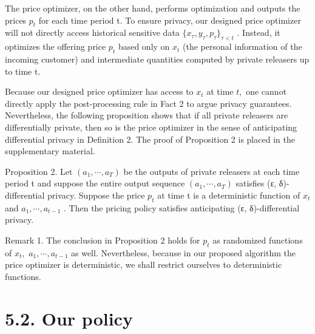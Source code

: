 The price optimizer, on the other hand, performs optimization and outputs the prices \(p _ { t }\) for each time period t. To ensure privacy, our designed price optimizer will not directly access historical sensitive data \(\{ x _ { \tau } , y _ { \tau } , p _ { \tau } \} _ { \tau < t }\) . Instead, it optimizes the offering price \(p _ { t }\) based only on \(x _ { t }\) (the personal information of the incoming customer) and intermediate quantities computed by private releasers up to time t.

Because our designed price optimizer has access to \(x _ { t }\) at time \(t ,\) one cannot directly apply the post-processing rule in Fact 2 to argue privacy guarantees. Nevertheless, the following proposition shows that if all private releasers are differentially private, then so is the price optimizer in the sense of anticipating differential privacy in Definition 2. The proof of Proposition 2 is placed in the supplementary material.

Proposition 2. Let \(( a _ { 1 } , \cdots , a _ { T } )\) be the outputs of private releasers at each time period t and suppose the entire output sequence \(( a _ { 1 } , \cdots , a _ { T } )\) satisfies (ε, δ)-differential privacy. Suppose the price \(p _ { t }\) at time t is a deterministic function of \(x _ { t }\) and \(a _ { 1 } , \cdots , a _ { t - 1 }\) . Then the pricing policy satisfies anticipating (ε, δ)-differential privacy.

Remark 1. The conclusion in Proposition 2 holds for \(p _ { t }\) as randomized functions of \(x _ { t } ,\) \(a _ { 1 } , \cdots , a _ { t - 1 }\) as well. Nevertheless, because in our proposed algorithm the price optimizer is deterministic, we shall restrict ourselves to deterministic functions.

\section{5.2. Our policy}\label{our-policy}

